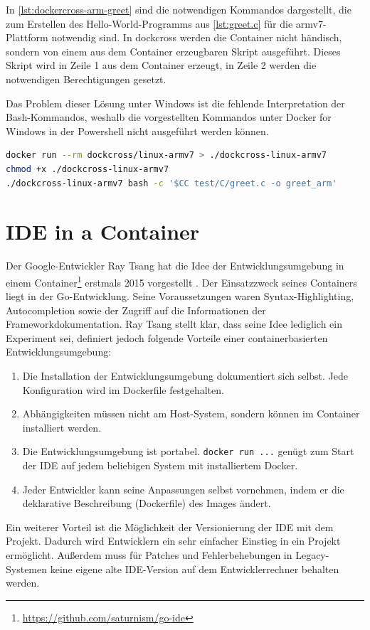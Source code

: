 In \cref{lst:dockercross-arm-greet} sind die notwendigen Kommandos dargestellt, die zum Erstellen des Hello-World-Programms aus \cref{lst:greet.c} für die armv7-Plattform notwendig sind.
In dockcross werden die Container nicht händisch, sondern von einem aus dem Container erzeugbaren Skript ausgeführt.
Dieses Skript wird in Zeile 1 aus dem Container erzeugt, in Zeile 2 werden die notwendigen Berechtigungen gesetzt.

Das Problem dieser Lösung unter Windows ist die fehlende Interpretation der Bash-Kommandos, weshalb die vorgestellten Kommandos unter Docker for Windows in der Powershell nicht ausgeführt werden können.

\begin{lstlisting}[caption=Kommandos zum Kompilieren mit dockcross, language=bash, label=lst:dockercross-arm-greet]
docker run --rm dockcross/linux-armv7 > ./dockcross-linux-armv7
chmod +x ./dockcross-linux-armv7
./dockcross-linux-armv7 bash -c '$CC test/C/greet.c -o greet_arm'
\end{lstlisting}

\section{IDE in a Container}
\label{sec:ideinacontainer}
Der Google-Entwickler Ray Tsang hat die Idee der Entwicklungsumgebung in einem Container\footnote{\url{https://github.com/saturnism/go-ide}} erstmals 2015 vorgestellt \autocite{go-ide-in-a-container:online}.
Der Einsatzzweck seines Containers liegt in der Go-Entwicklung.
Seine Voraussetzungen waren Syntax-Highlighting, Autocompletion sowie der Zugriff auf die Informationen der Frameworkdokumentation.
Ray Tsang stellt klar, dass seine Idee lediglich ein Experiment sei, definiert jedoch folgende Vorteile einer containerbasierten Entwicklungsumgebung:
\begin{enumerate}
    \item Die Installation der Entwicklungsumgebung dokumentiert sich selbst. Jede Konfiguration wird im Dockerfile festgehalten.
    \item Abhängigkeiten müssen nicht am Host-System, sondern können im Container installiert werden.
    \item Die Entwicklungsumgebung ist portabel. \texttt{docker run ...} genügt zum Start der IDE auf jedem beliebigen System mit installiertem Docker.
    \item Jeder Entwickler kann seine Anpassungen selbst vornehmen, indem er die deklarative Beschreibung (Dockerfile) des Images ändert.
\end{enumerate}
Ein weiterer Vorteil ist die Möglichkeit der Versionierung der IDE mit dem Projekt.
Dadurch wird Entwicklern ein sehr einfacher Einstieg in ein Projekt ermöglicht.
Außerdem muss für Patches und Fehlerbehebungen in Legacy-Systemen keine eigene alte IDE-Version auf dem Entwicklerrechner behalten werden.

